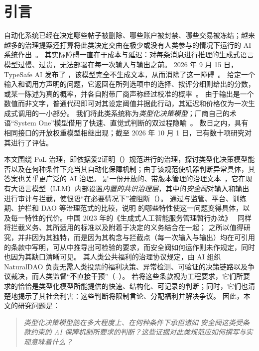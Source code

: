 \section{引言}
\label{sec:intro}

自动化系统已经在决定哪些帖子被删除、哪些账户被封禁、哪些交易被冻结；越来越多的治理提案还打算将此类决定交由在极少或没有人类参与的情况下运行的 AI 系统作出~\cite{gorwa2020algorithmic,gillespie2018custodians,citron2008technological}。
其实际障碍一直在于成本与延迟：对每条消息进行推理的生成式语言模型过慢、过贵，无法部署在每一次输入与输出之前。
2026 年 9 月 15 日，TypeSafe AI 发布了 \jev{}，该模型完全不生成文本，从而消除了这一障碍~\cite{almeida2026introducing,typesafe_intro}。
给定一个输入和调用方声明的问题，它返回在所列选项中的选择、按评分细则给出的分数，或某一陈述为真的概率，并各自附带厂商声称经过校准的概率~\cite{typesafe_primer,typesafe_models}。
由于输出是一个数值而非文字，普通代码即可对其设定阈值并据此行动，其延迟和价格仅为一次生成式调用的一小部分。
我们将此类系统称为\emph{类型化决策模型}；厂商自己的术语“System One”模型借用了快速、直觉式判断的双过程隐喻~\cite{kahneman2011thinking}。
数日之内，具有相同接口的开放权重模型相继出现；截至 2026 年 10 月 1 日，已有数十项研究对其进行了评估。

本文围绕 PoL 治理，即依据爱2证明（\pol{}）规范进行的治理，探讨类型化决策模型能否以及在何种条件下充当其自动化保障机制；由于该规范使机器判断异常具体，其答案也关乎更广泛的 AI 治理。
\pol{} 是一份开放的、带版本管理的治理文本~\cite{pol2text,pol2en}，它在现有大语言模型（LLM）内部设置\emph{内置的共识治理层}，其中的\emph{安全阀}对输入和输出进行审计与拦截，使恨语“在必要情况下”被阻断（）。
 通过与监管、平台、训练期、护栏和 DAO 等治理范式的比较，说明 \pol{} 的哪些特性使这一问题变得具体，以及每一特性的代价。中国 2023 年的《生成式人工智能服务管理暂行办法》~\cite{cac2023genai} 同样将拦截义务、其所适用的标准以及附着于决定的义务结合在一起；\pol{} 之所以值得研究，并非因为其独特，而是因为其构念与拦截点（每一次输入与输出）均在可引用的条款中写明，可从中推导出可检验的要求，而安全阀如何运作则未作规定，同时也因为其缺口清晰可见。
其人类公共福利的治理协议规定，由 AI 组织 NaturalDAO 负责无需人类投票的福利决策、异常检测、可验证的决策链路以及争议裁决，而人类监督“不直接干预”（--）。
若将这些条款视为工程要求，它们所要求的恰恰是类型化模型所能提供的快速、结构化、可记录的判断；同时，它们也清楚地揭示了其社会利害：这些判断将限制言论、分配福利并解决争议。
因此，本文的研究问题是：
\begin{quote}
\emph{类型化决策模型能在多大程度上、在何种条件下承担诸如 \pol{} 安全阀这类受条款约束的 AI 保障机制所要求的判断？这些证据对此类规范应如何撰写与实现意味着什么？}
\end{quote}

